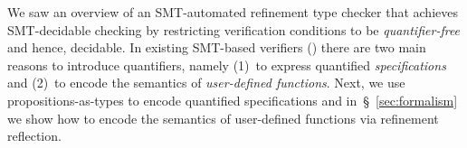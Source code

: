 %
We saw an overview of an SMT-automated refinement 
type checker that achieves SMT-decidable checking 
by restricting verification conditions to be 
\emph{quantifier-free} and hence, decidable.
%
In existing SMT-based verifiers (\eg \dafny) there 
are two main reasons to introduce quantifiers, namely
%
(1)~to express quantified \emph{specifications} and 
(2)~to encode the semantics of \emph{user-defined functions}.
%
Next, we use propositions-as-types to encode 
quantified specifications and in~\S~\ref{sec:formalism} 
we show how to encode the semantics of user-defined functions 
via refinement reflection.
